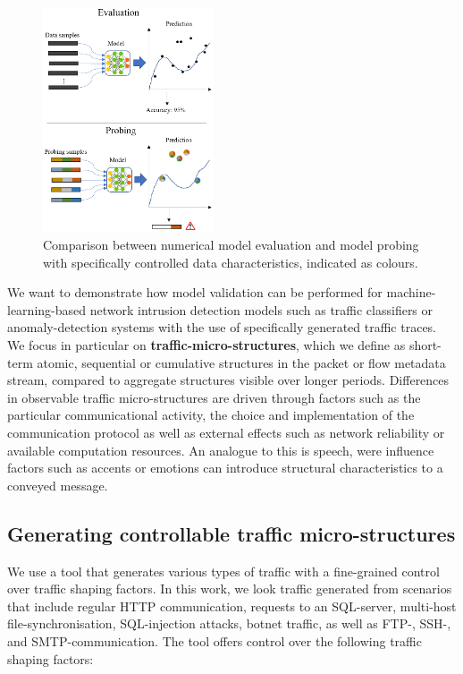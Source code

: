 \documentclass[conference]{IEEEtran}
\begin{document}
\begin{figure}
\centering
\includegraphics[width=0.45\textwidth]{images/Eva_Prob2.png}
\caption{Comparison between numerical model evaluation and model probing with specifically controlled data characteristics, indicated as colours.}\label{fig:Subspace_disp}
\end{figure}


We want to demonstrate how model validation can be performed for machine-learning-based network intrusion detection models such as traffic classifiers or anomaly-detection systems with the use of specifically generated traffic traces. We focus in particular on \textbf{traffic-micro-structures}, which we define as  short-term atomic, sequential or cumulative structures in the packet or flow metadata stream, compared to aggregate structures visible over longer periods. Differences in observable traffic micro-structures are driven through factors such as the particular communicational activity, the choice and implementation of the communication protocol as well as external effects such as network reliability or available computation resources. An analogue to this is speech, were influence factors such as accents or emotions can introduce structural characteristics to a conveyed message.


\subsection{Generating controllable traffic micro-structures}\label{Control}

We use a tool that generates various types of traffic with a fine-grained control over traffic shaping factors. In this work, we look traffic generated from scenarios that include regular HTTP communication, requests to an SQL-server, multi-host file-synchronisation, SQL-injection attacks, botnet traffic, as well as FTP-, SSH-, and SMTP-communication. The tool offers control over the following traffic shaping factors:
\end{document}
